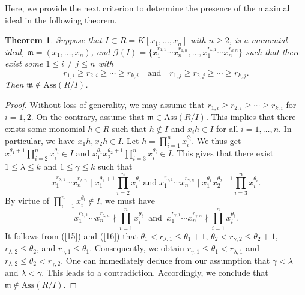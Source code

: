 \documentclass[11pt]{amsart}
\newtheorem{theorem}{Theorem}[section]
\begin{document}

Here, we provide the next criterion to determine the presence of the maximal ideal in the following theorem. 

\begin{theorem} \label{Th.Not.maximal.1}
Suppose that    $I \subset R=K[x_1, \ldots, x_n]$ with $n\geq 2$,   is   a monomial ideal, $\mathfrak{m}=(x_1, \ldots, x_n)$, and 
  $\mathcal{G}(I)=\{x^{r_{1,1}}_1\cdots x^{r_{1,n}}_n, \ldots, x^{r_{k,1}}_1\cdots x^{r_{k,n}}_n\}$
  such that  there exist some  $1\leq i\neq j \leq n$ with 
  $$r_{1,i} \geq r_{2,i} \geq \cdots \geq r_{k, i} \quad \text{and} \quad r_{1,j} \geq r_{2,j} \geq \cdots \geq r_{k, j}.$$ 
   Then   $\mathfrak{m}\notin \mathrm{Ass}(R/I)$. 
\end{theorem}

\begin{proof} 
Without loss of generality, we may assume that   $r_{1,i} \geq r_{2,i} \geq \cdots \geq r_{k, i}$ for $i=1,2$. 
On the contrary, assume that $\mathfrak{m}\in \mathrm{Ass}(R/I)$. This implies that there exists some monomial $h\in R$ such that  $h\notin I$ and 
  $x_ih\in I$ for all $i=1, \ldots, n$. In particular, we have $x_1h, x_2h \in I$.   Let $h=\prod_{i=1}^n x_i^{\theta_i}$. We thus get 
 $x_1^{\theta_1 +1} \prod_{i=2}^n x_i^{\theta_i}\in I$ and $x_1^{\theta_1} x_2^{\theta_2+1}\prod_{i=3}^n x_i^{\theta_i} \in I$. 
  This gives  that there exist  $1\leq \lambda \leq k$  and $1\leq \gamma \leq k$  such that 
  \begin{equation} \label{15}
  x^{r_{\lambda,1}}_1\cdots x^{r_{\lambda,n}}_n \mid x_1^{\theta_1 +1} \prod_{i=2}^n x_i^{\theta_i} \;  \text {and} \;  
  x^{r_{\gamma,1}}_1\cdots x^{r_{\gamma,n}}_n \mid x_1^{\theta_1} x_2^{\theta_2+1}\prod_{i=3}^n x_i^{\theta_i}.
  \end{equation}
       By virtue  of    $\prod_{i=1}^n x_i^{\theta_i}\notin I$,   we must have
      \begin{equation} \label{16}
      x^{r_{\lambda,1}}_1\cdots x^{r_{\lambda,n}}_n \nmid  \prod_{i=1}^n x_i^{\theta_i} \;\; \text{and} \;\;  
     x^{r_{\gamma,1}}_1\cdots x^{r_{\gamma,n}}_n \nmid  \prod_{i=1}^n x_i^{\theta_i}.
      \end{equation}
     It follows from (\ref{15}) and (\ref{16})  that  $\theta_1 < r_{\lambda,1} \leq \theta_1+1$, $\theta_2 < r_{\gamma,2} \leq \theta_2+1$, 
   $r_{\lambda, 2} \leq \theta_2$, and $r_{\gamma, 1} \leq \theta_1$. Consequently, we  obtain $r_{\gamma, 1} \leq \theta_1 < r_{\lambda,1}$ and 
   $r_{\lambda, 2} \leq \theta_2< r_{\gamma,2}$. One can immediately deduce  from  our assumption  that 
    $\gamma < \lambda$ and $\lambda < \gamma$. This leads to a contradiction. Accordingly, we conclude that   $\mathfrak{m}\notin \mathrm{Ass}(R/I)$.    
\end{proof}
\end{document}
